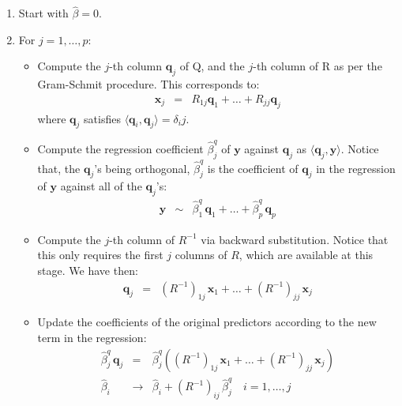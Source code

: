 \begin{enumerate}
	\item Start with $\hat{\beta} = 0$.
	\item For $j = 1, \ldots, p$:
	\begin{itemize}
		\item Compute the $j$-th column $\mathbf{q}_j$ of Q, and the $j$-th column of R as per
			the Gram-Schmit procedure. This corresponds to:
			\begin{eqnarray*}
			\mathbf{x}_j & = & R_{1j} \mathbf{q}_1 + \ldots + R_{jj} \mathbf{q}_j
			\end{eqnarray*}
			where $\mathbf{q}_j$ satisfies $\langle \mathbf{q}_i, \mathbf{q}_j \rangle = \delta_ij$.
		\item Compute the regression coefficient $\hat{\beta}_j^q$ of $\mathbf{y}$ against $\mathbf{q}_j$
			as $\langle \mathbf{q}_j, \mathbf{y} \rangle$. Notice that, the $\mathbf{q}_j$'s being orthogonal,
			$\hat{\beta}_j^q$ is the coefficient of $\mathbf{q}_j$ in the regression of $\mathbf{y}$ against
			all of the $\mathbf{q}_j$'s:
			\begin{eqnarray*}
				\mathbf{y} & \sim & \hat{\beta}^q_1\, \mathbf{q}_1 + \ldots + \hat{\beta}^q_p\, \mathbf{q}_p
			\end{eqnarray*}
		\item Compute the $j$-th column of $R^{-1}$ via backward substitution. Notice that this only 
		requires the first $j$ columns of $R$, which are available at this stage. We have then:
		\begin{eqnarray}
		\label{3p4_e1}
		\mathbf{q}_j & = & (R^{-1})_{1j}\,\mathbf{x}_1 + \ldots + (R^{-1})_{jj}\, \mathbf{x}_j
		\end{eqnarray}
		\item Update the coefficients of the original predictors according to the new term in the regression:
		\begin{eqnarray*}
		\hat{\beta}^q_j\, \mathbf{q}_j & = & \hat{\beta}^q_j \left( (R^{-1})_{1j}\,\mathbf{x}_1 + \ldots + (R^{-1})_{jj}\, \mathbf{x}_j \right)\\
		\hat{\beta}_i &\rightarrow& \hat{\beta}_i + (R^{-1})_{ij}\,\hat{\beta}^q_j \quad i = 1,\ldots,j
		\end{eqnarray*}
	\end{itemize}
\end{enumerate}

